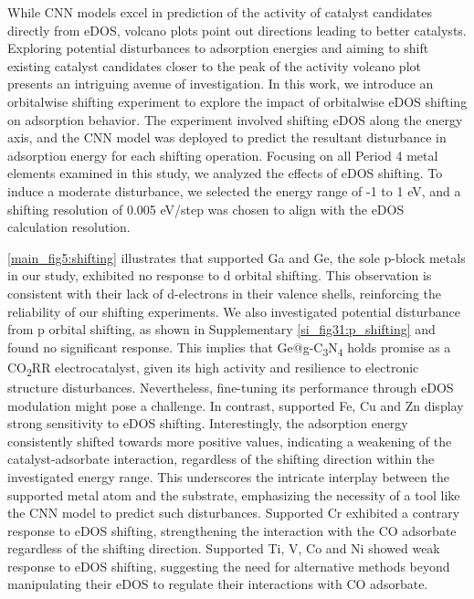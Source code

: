 While CNN models excel in prediction of the activity of catalyst candidates directly from eDOS, volcano plots point out directions leading to better catalysts.
Exploring potential disturbances to adsorption energies and aiming to shift existing catalyst candidates closer to the peak of the activity volcano plot presents an intriguing avenue of investigation.
In this work, we introduce an orbitalwise shifting experiment to explore the impact of orbitalwise eDOS shifting on adsorption behavior.
The experiment involved shifting eDOS along the energy axis, and the CNN model was deployed to predict the resultant disturbance in adsorption energy for each shifting operation.
Focusing on all Period 4 metal elements examined in this study, we analyzed the effects of eDOS shifting.
To induce a moderate disturbance, we selected the energy range of -1 to 1 eV, and a shifting resolution of 0.005 eV/step was chosen to align with the eDOS calculation resolution.

\cref{main_fig5:shifting} illustrates that supported Ga and Ge, the sole p-block metals in our study, exhibited no response to d orbital shifting.
This observation is consistent with their lack of d-electrons in their valence shells, reinforcing the reliability of our shifting experiments.
We also investigated potential disturbance from p orbital shifting, as shown in Supplementary \cref{si_fig31:p_shifting} and found no significant response.
This implies that Ge@g-C\textsubscript{3}N\textsubscript{4} holds promise as a CO\textsubscript{2}RR electrocatalyst, given its high activity and resilience to electronic structure disturbances.
Nevertheless, fine-tuning its performance through eDOS modulation might pose a challenge.
In contrast, supported Fe, Cu and Zn display strong sensitivity to eDOS shifting.
Interestingly, the adsorption energy consistently shifted towards more positive values, indicating a weakening of the catalyst-adsorbate interaction, regardless of the shifting direction within the investigated energy range.
This underscores the intricate interplay between the supported metal atom and the substrate, emphasizing the necessity of a tool like the CNN model to predict such disturbances.
Supported Cr exhibited a contrary response to eDOS shifting, strengthening the interaction with the CO adsorbate regardless of the shifting direction.
Supported Ti, V, Co and Ni showed weak response to eDOS shifting, suggesting the need for alternative methods beyond manipulating their eDOS to regulate their interactions with CO adsorbate.

